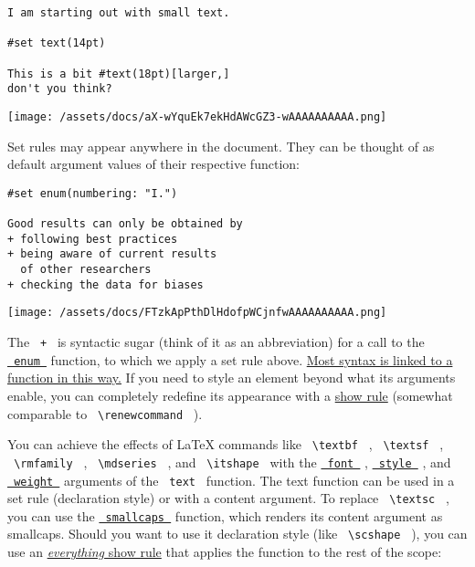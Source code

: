 \begin{verbatim}
I am starting out with small text.

#set text(14pt)

This is a bit #text(18pt)[larger,]
don't you think?
\end{verbatim}

\texttt{[image: /assets/docs/aX-wYquEk7ekHdAWcGZ3-wAAAAAAAAAA.png]}

Set rules may appear anywhere in the document. They can be thought of as
default argument values of their respective function:

\begin{verbatim}
#set enum(numbering: "I.")

Good results can only be obtained by
+ following best practices
+ being aware of current results
  of other researchers
+ checking the data for biases
\end{verbatim}

\texttt{[image: /assets/docs/FTzkApPthDlHdofpWCjnfwAAAAAAAAAA.png]}

The \texttt{\ +\ } is syntactic sugar (think of it as an abbreviation)
for a call to the \href{/docs/reference/model/enum/}{\texttt{\ enum\ }}
function, to which we apply a set rule above.
\href{/docs/reference/syntax/}{Most syntax is linked to a function in
this way.} If you need to style an element beyond what its arguments
enable, you can completely redefine its appearance with a
\href{/docs/reference/styling/\#show-rules}{show rule} (somewhat
comparable to \texttt{\ \textbackslash{}renewcommand\ } ).

You can achieve the effects of LaTeX commands like
\texttt{\ \textbackslash{}textbf\ } ,
\texttt{\ \textbackslash{}textsf\ } ,
\texttt{\ \textbackslash{}rmfamily\ } ,
\texttt{\ \textbackslash{}mdseries\ } , and
\texttt{\ \textbackslash{}itshape\ } with the
\href{/docs/reference/text/text/\#parameters-font}{\texttt{\ font\ }} ,
\href{/docs/reference/text/text/\#parameters-style}{\texttt{\ style\ }}
, and
\href{/docs/reference/text/text/\#parameters-weight}{\texttt{\ weight\ }}
arguments of the \texttt{\ text\ } function. The text function can be
used in a set rule (declaration style) or with a content argument. To
replace \texttt{\ \textbackslash{}textsc\ } , you can use the
\href{/docs/reference/text/smallcaps/}{\texttt{\ smallcaps\ }} function,
which renders its content argument as smallcaps. Should you want to use
it declaration style (like \texttt{\ \textbackslash{}scshape\ } ), you
can use an \href{/docs/reference/styling/\#show-rules}{\emph{everything}
show rule} that applies the function to the rest of the scope:

